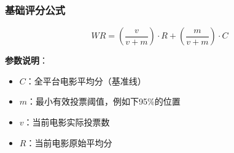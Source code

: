 \documentclass{beamer}
\begin{document}

\begin{frame}
    \frametitle{基础评分公式}
    \[ WR = \left(\frac{v}{v+m}\right) \cdot R + \left(\frac{m}{v+m}\right) \cdot C \]

    \vspace{0.5cm}
    \textbf{参数说明}：
    \begin{itemize}
        \item $C$：全平台电影平均分（基准线）
        \item $m$：最小有效投票阈值，例如下95\%的位置
        \item $v$：当前电影实际投票数
        \item $R$：当前电影原始平均分
    \end{itemize}
\end{frame}
\end{document}
